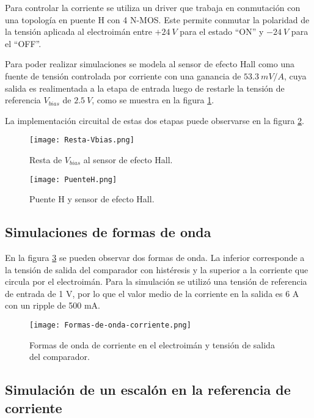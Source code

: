 Para controlar la corriente se utiliza un driver que trabaja en conmutación con una topología en puente H con 4 N-MOS. Este permite conmutar la polaridad de la tensión aplicada al electroimán entre $+24\:V$ para el estado “ON” y $-24\:V$ para el “OFF”. 

Para poder realizar simulaciones se modela al sensor de efecto Hall como una fuente de tensión controlada por corriente con una ganancia de $53.3\:mV/A$, cuya salida es realimentada a la etapa de entrada luego de restarle la tensión de referencia  $V_{bias}$ de $2.5\:V$, como se muestra en la figura \ref{fig:img_resta-Vbias}.

La implementación circuital de estas dos etapas puede observarse en la figura \ref{fig:img_puenteH}. 


\begin{figure}[H]
	\centering
	\texttt{[image: Resta-Vbias.png]}
	\caption{Resta de $V_{bias}$ al sensor de efecto Hall.}
	\label{fig:img_resta-Vbias}
\end{figure}

\begin{figure}[H]
	\centering
	\texttt{[image: PuenteH.png]}
	\caption{Puente H y sensor de efecto Hall.}
	\label{fig:img_puenteH}
\end{figure}

\subsection{Simulaciones de formas de onda}

\noindent En la figura \ref{fig:img_formas-de-onda-corriente} se pueden observar dos formas de onda. La inferior  corresponde a la tensión de salida del comparador con histéresis y la superior a la corriente que circula por el electroimán. Para la simulación se utilizó una tensión de referencia de entrada de 1 V, por lo que el valor medio de la corriente en la salida es 6 A con un ripple de 500 mA.

\begin{figure}[H]
	\centering
	\texttt{[image: Formas-de-onda-corriente.png]}
	\caption{Formas de onda de corriente en el electroimán y tensión de salida del comparador.}
	\label{fig:img_formas-de-onda-corriente}
\end{figure}



\subsection{Simulación de un escalón en la referencia de corriente}

